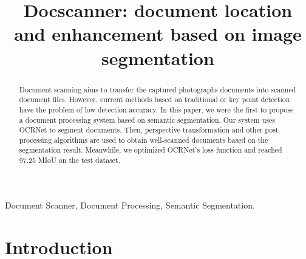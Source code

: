 \documentclass[10pt, conference, compsocconf]{IEEEtran}
\begin{document}
%
\title{Docscanner: document location and enhancement based on image segmentation}

\author{
}
\maketitle
\begin{abstract}

Document scanning aims to transfer the captured photographs documents into scanned document files. 
However, current methods based on traditional or key point detection have the problem of low detection accuracy.
In this paper, we were the first to propose a document processing system based on semantic segmentation.
Our system uses OCRNet to segment documents.
Then, perspective transformation and other post-processing algorithms are used to obtain well-scanned documents based on the segmentation result.
Meanwhile, we optimized OCRNet's loss function and reached 97.25 MIoU on the test dataset.

\end{abstract}

\begin{IEEEkeywords}

Document Scanner, Document Processing, Semantic Segmentation.

\end{IEEEkeywords}

\IEEEpeerreviewmaketitle

\section{Introduction}
\end{document}
